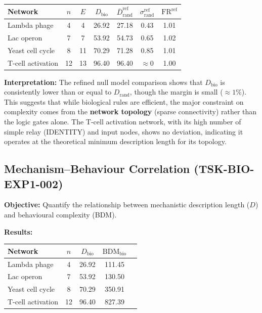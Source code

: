 \documentclass{article}
\begin{document}
\begin{center}
\begin{tabular}{l c c c c c c}
\hline
Network & $n$ & $E$ & $D_{\text{bio}}$ & $\bar{D}_{\text{rand}}^{\text{ref}}$ & $\sigma_{\text{rand}}^{\text{ref}}$ & $\text{FR}^{\text{ref}}$ \\
\hline
Lambda phage & 4  & 4  & 26.92 & 27.18 & 0.43 & 1.01 \\
Lac operon   & 7  & 7  & 53.92 & 54.73 & 0.65 & 1.02 \\
Yeast cell cycle & 8 & 11 & 70.29 & 71.28 & 0.85 & 1.01 \\
T-cell activation & 12 & 13 & 96.40 & 96.40 & $\approx 0$ & 1.00 \\
\hline
\end{tabular}
\end{center}

\textbf{Interpretation:}
The refined null model comparison shows that $D_{\text{bio}}$ is consistently lower than or equal to $D_{\text{rand}}$, though the margin is small ($\approx 1\%$). This suggests that while biological rules are efficient, the major constraint on complexity comes from the \textbf{network topology} (sparse connectivity) rather than the logic gates alone. The T-cell activation network, with its high number of simple relay (IDENTITY) and input nodes, shows no deviation, indicating it operates at the theoretical minimum description length for its topology.

\subsection{Mechanism--Behaviour Correlation (TSK-BIO-EXP1-002)}
\textbf{Objective:} Quantify the relationship between mechanistic description length ($D$) and behavioural complexity (BDM).

\textbf{Results:}
\begin{center}
\begin{tabular}{l c c c c}
\hline
Network & $n$ & $D_{\text{bio}}$ & $\mathrm{BDM}_{\text{bio}}$ \\
\hline
Lambda phage & 4  & 26.92 & 111.45 \\
Lac operon   & 7  & 53.92 & 130.50 \\
Yeast cell cycle & 8 & 70.29 & 350.91 \\
T-cell activation & 12 & 96.40 & 827.39 \\
\hline
\end{tabular}
\end{center}
\end{document}
